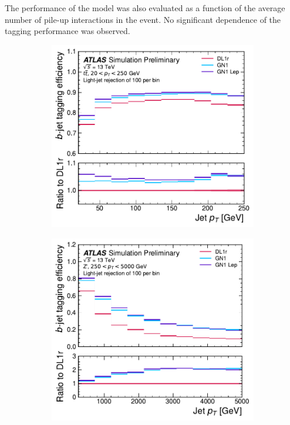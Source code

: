 The performance of the model was also evaluated as a function of the average number of pile-up interactions in the event. No significant dependence of the tagging performance was observed.


\begin{figure}[!htbp]
    \centering
    \begin{subfigure}[b]{0.48\textwidth}
        \centering
        \includegraphics[width=\textwidth]{chapters/gnn_tagger/figs/results/main/ttbar/ttbar_flat_leff_by_pt_btag.pdf}
    \end{subfigure}
    \quad
    \begin{subfigure}[b]{0.48\textwidth}
        \centering
        \includegraphics[width=\textwidth]{chapters/gnn_tagger/figs/results/main/zprime/zprime_flat_leff_by_pt_btag.pdf}

\end{subfigure}
\end{figure}
